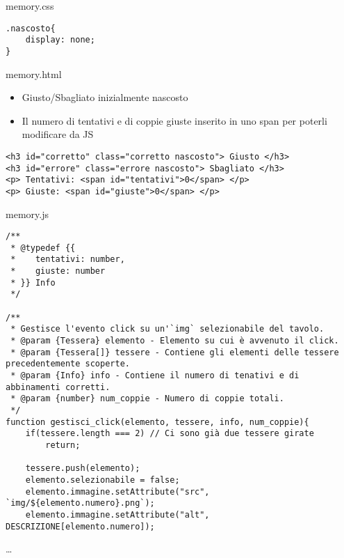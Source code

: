 \begin{frame}[fragile]\transfade
  \begin{sol}\centering
    memory.css
      \begin{verbatim}
.nascosto{
    display: none;
}
      \end{verbatim}
      memory.html
      \begin{itemize}
        \item Giusto/Sbagliato inizialmente nascosto
        \item Il numero di tentativi e di coppie giuste inserito in uno span per poterli modificare da JS
      \end{itemize}
      \begin{verbatim}
<h3 id="corretto" class="corretto nascosto"> Giusto </h3>
<h3 id="errore" class="errore nascosto"> Sbagliato </h3>
<p> Tentativi: <span id="tentativi">0</span> </p>
<p> Giuste: <span id="giuste">0</span> </p>
      \end{verbatim}
  \end{sol}
\end{frame}
\begin{frame}[fragile]\transfade
  \begin{sol}\centering
    memory.js
\begin{verbatim}
/**
 * @typedef {{
 *    tentativi: number,
 *    giuste: number
 * }} Info
 */

/**
 * Gestisce l'evento click su un'`img` selezionabile del tavolo.
 * @param {Tessera} elemento - Elemento su cui è avvenuto il click.
 * @param {Tessera[]} tessere - Contiene gli elementi delle tessere precedentemente scoperte.
 * @param {Info} info - Contiene il numero di tenativi e di abbinamenti corretti.
 * @param {number} num_coppie - Numero di coppie totali.
 */
function gestisci_click(elemento, tessere, info, num_coppie){
    if(tessere.length === 2) // Ci sono già due tessere girate
        return;

    tessere.push(elemento);
    elemento.selezionabile = false;
    elemento.immagine.setAttribute("src", `img/${elemento.numero}.png`);
    elemento.immagine.setAttribute("alt", DESCRIZIONE[elemento.numero]);

      \end{verbatim}
      \dots
  \end{sol}
\end{frame}
